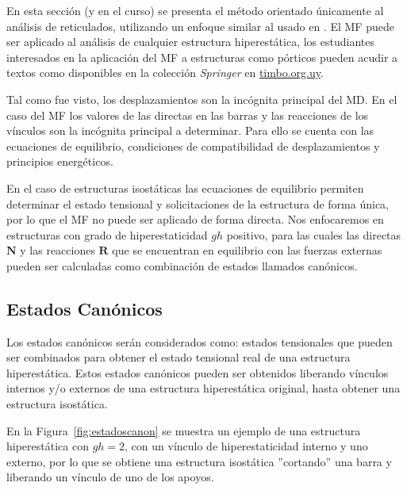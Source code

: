 En esta sección (y en el curso) se presenta el método orientado únicamente al análisis de reticulados, utilizando un enfoque similar al usado en \citep{Reddy2002b}. %
El MF puede ser aplicado al análisis de cualquier estructura hiperestática, los estudiantes interesados en la aplicación del MF a estructuras como pórticos pueden acudir a textos como \citep{Krenk2013,Fuchs2016} disponibles en la colección \textit{Springer} en \href{http://timbo.org.uy/}{timbo.org.uy}.
%

Tal como fue visto, los desplazamientos son la incógnita principal del MD. %
En el caso del MF los valores de las directas en las barras y las reacciones de los vínculos son la incógnita principal a determinar. %
%
Para ello se cuenta con las ecuaciones de equilibrio, condiciones de compatibilidad de desplazamientos y principios energéticos.


En el caso de estructuras isostáticas las ecuaciones de equilibrio permiten determinar el estado tensional y solicitaciones de la estructura de forma única, por lo que el MF no puede ser aplicado de forma directa. %
%
%
Nos enfocaremos en estructuras con grado de hiperestaticidad $gh$ positivo, para las cuales las directas $\textbf{N}$ y las reacciones $\textbf{R}$ que se encuentran en equilibrio con las fuerzas externas pueden ser calculadas como combinación de estados llamados canónicos. %



\subsection{Estados Canónicos}

Los estados canónicos serán considerados como: estados tensionales que pueden ser combinados para obtener el estado tensional real de una estructura hiperestática. %
%
Estos estados canónicos pueden ser obtenidos liberando vínculos internos y/o externos de una estructura hiperestática original, hasta obtener una estructura isostática.

En la Figura~\ref{fig:estadoscanon} se muestra un ejemplo de una estructura hiperestática con $gh=2$, con un vínculo de hiperestaticidad interno y uno externo, por lo que se obtiene una estructura isostática ''cortando'' una barra y liberando un vínculo de uno de los apoyos. %


